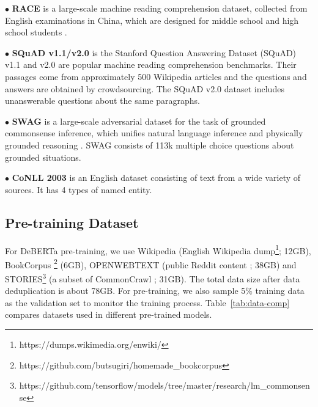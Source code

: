 \noindent $\bullet$ \textbf{RACE}  is a large-scale machine reading comprehension dataset, collected from English examinations in China, which are designed for middle school and high school students \citep{lai2017race}. 

\noindent $\bullet$ \textbf{SQuAD v1.1/v2.0} is the Stanford Question
Answering Dataset (SQuAD) v1.1 and v2.0 \citep{squad1,squad2} are popular machine reading comprehension benchmarks. Their passages come from approximately 500 Wikipedia articles and the questions and answers are obtained by crowdsourcing. The SQuAD v2.0 dataset includes unanswerable questions about the same paragraphs.

\noindent $\bullet$ \textbf{SWAG} is a large-scale adversarial dataset for the task of grounded commonsense inference, which unifies natural language inference and physically grounded reasoning \citep{zellers2018swag}. SWAG consists of 113k multiple choice questions about grounded situations.

\noindent $\bullet$ \textbf{CoNLL 2003}  is an English dataset consisting of text from a wide variety of sources. It has 4 types of named entity.

\subsection{Pre-training Dataset}
\label{appendix:pre-train}
For DeBERTa pre-training, we use Wikipedia (English Wikipedia dump\footnote{https://dumps.wikimedia.org/enwiki/}; 12GB), BookCorpus \citep{bookcorpus} \footnote{https://github.com/butsugiri/homemade\_bookcorpus} (6GB), OPENWEBTEXT (public Reddit content \citep{Gokaslan2019OpenWeb}; 38GB) and STORIES\footnote{https://github.com/tensorflow/models/tree/master/research/lm\_commonsense} (a subset of CommonCrawl \citep{trinh2018simple}; 31GB). The total data size after data deduplication\citep{shoeybi2019megatron} is about 78GB. For pre-training, we also sample 5\% training data as the validation set to monitor the training process. Table~\ref{tab:data-comp} compares datasets used in different pre-trained models.

